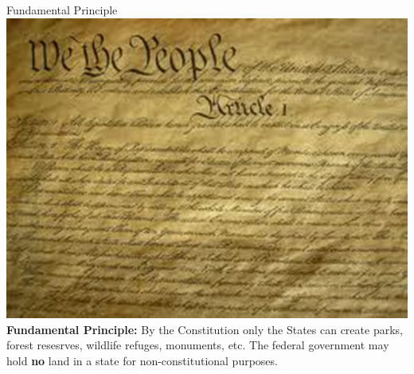 \begin{frame}{Fundamental Principle}
   \centering
   \includegraphics[height=.6\textheight]{img/constitution.png} \\
   \textbf{Fundamental Principle:} By the Constitution only the States can
   create parks, forest resesrves, wildlife refuges, monuments, etc. The
   federal government may hold \textbf{no} land in a state for
   non-constitutional purposes.
\end{frame}

